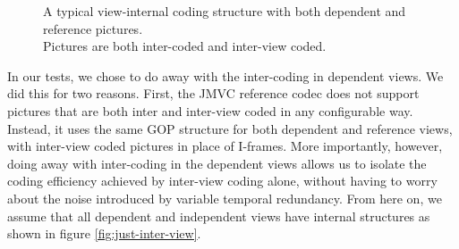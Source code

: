 \documentclass{sig-alternate-05-2015}
\begin{document}
\begin{figure}[H]
\begin{center}
\end{center}
\caption{
A typical view-internal coding structure
with both dependent and reference pictures. \\
Pictures are both inter-coded and inter-view coded.
}
\label{fig:inter-view}
\end{figure}

In our tests, we chose to do away with the inter-coding in dependent views. We
did this for two reasons. First, the JMVC reference codec does not support
pictures that are both inter and inter-view coded in any configurable way.
Instead, it uses the same GOP structure for both dependent and reference views,
with inter-view coded pictures in place of I-frames. More importantly, however,
doing away with inter-coding in the dependent views allows us to isolate the
coding efficiency achieved by inter-view coding alone, without having to worry
about the noise introduced by variable temporal redundancy. From here on, we
assume that all dependent and independent views have internal structures as
shown in figure \ref{fig:just-inter-view}.
\end{document}
